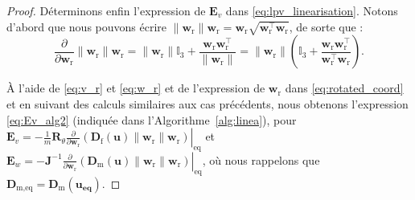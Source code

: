 \begin{proof}
Déterminons enfin l'expression de $\boldsymbol{E}_{v}$ dans \eqref{eq:lpv_linearisation}. Notons d'abord que nous pouvons écrire
$\|\boldsymbol{w}_\text{r}\| \boldsymbol{w}_\text{r} = 
 \boldsymbol{w}_\text{r} \sqrt{\boldsymbol{w}_\text{r}^\top \boldsymbol{w}_\text{r}  }$, de sorte que :
$$
\frac{\partial }{\partial \boldsymbol{w}_\text{r}}
\|\boldsymbol{w}_\text{r}\| \boldsymbol{w}_\text{r} = 
\|\boldsymbol{w}_\text{r}\| \mathbb{I}_3
+ \frac{\boldsymbol{w}_\text{r} \boldsymbol{w}_\text{r}^\top}{\|\boldsymbol{w}_\text{r}\|} = 
\|\boldsymbol{w}_\text{r}\|
\left( \mathbb{I}_3 + \frac{\boldsymbol{w}_\text{r} \boldsymbol{w}_\text{r}^\top}{\boldsymbol{w}_\text{r}^\top \boldsymbol{w}_\text{r}} \right).
$$

À l'aide de \eqref{eq:v_r} et \eqref{eq:w_r} et de l'expression de $\boldsymbol{w}_\text{r}$ dans \eqref{eq:rotated_coord} et en suivant des calculs similaires aux cas précédents, nous obtenons l'expression
\eqref{eq:Ev_alg2} (indiquée dans l'Algorithme~\ref{alg:linea}), pour $\boldsymbol{E}_{v} = -  \frac{1}{m} \boldsymbol{R}_\theta \left. \frac{\partial}{\partial \boldsymbol{w}_\text{r}} \left(  \! \boldsymbol{D}_{\text{f}}(\boldsymbol{u}) \lVert \boldsymbol{w}_{\text{r}} \rVert \boldsymbol{w}_{\text{r}}  \right)\right|_{\mathrm{eq}} $ et  
 $\boldsymbol{E}_{w} = - \boldsymbol{J}^{-1} \left.
 \frac{\partial}{\partial \boldsymbol{w}_\text{r}} \left(  \boldsymbol{D}_{\text{m}}(\boldsymbol{u}) \lVert \boldsymbol{w}_{\text{r}} \rVert \boldsymbol{w}_{\text{r}}\right)\right|_{\mathrm{eq}}$, où nous rappelons que $\boldsymbol{D}_{\text{m,eq}} = \boldsymbol{D}_{\text{m}}(\boldsymbol{u_{\text{eq}}})$.
\end{proof}


